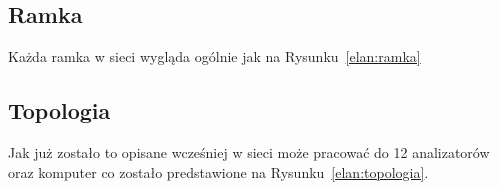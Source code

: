 \subsection{Ramka}
Każda ramka w sieci  wygląda ogólnie jak na Rysunku~\ref{elan:ramka}

\subsection{Topologia}
Jak już zostało to opisane wcześniej w sieci może pracować do 12 analizatorów oraz komputer co zostało predstawione na Rysunku~\ref{elan:topologia}.

